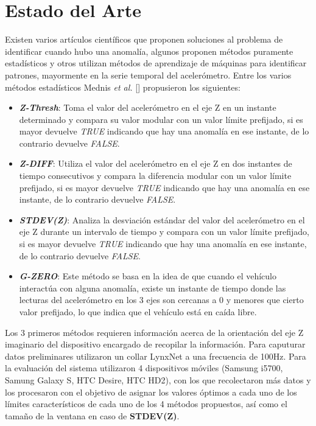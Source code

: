 \chapter{Estado del Arte}\label{chapter:state-of-the-art}

Existen varios artículos científicos que proponen soluciones al problema de identificar cuando hubo una anomalía, algunos proponen métodos
puramente estadísticos y otros utilizan métodos de aprendizaje de máquinas para identificar patrones, mayormente en la serie temporal del
acelerómetro. Entre los varios métodos estadísticos Mednis {\it et al.} [] propusieron los siguientes:\\

\begin{itemize}
	\item  \emph{\textbf {Z-Thresh}}: Toma el valor del acelerómetro en el eje Z en un instante determinado y compara su valor modular con 
	un valor límite prefijado, si es mayor devuelve {\it TRUE} indicando que hay una anomalía en ese instante, de lo contrario devuelve {\it FALSE}.\\
	\item \emph{\textbf {Z-DIFF}}: Utiliza el valor del acelerómetro en el eje Z en dos instantes de tiempo consecutivos y compara la
		diferencia modular con un valor límite prefijado, si es mayor devuelve {\it TRUE} indicando que hay una anomalía en ese instante, de lo contrario devuelve {\it FALSE}.\\
	\item \emph{\textbf {STDEV(Z)}}: Analiza la desviación estándar del valor del acelerómetro en el eje Z durante un intervalo de
		tiempo y compara con un valor límite prefijado, si es mayor devuelve {\it TRUE} indicando que hay una anomalía en ese instante, de lo contrario devuelve {\it FALSE}.\\ 
	\item \emph{\textbf {G-ZERO}}: Este método se basa en la idea de que cuando el vehículo interactúa con alguna anomalía, existe un
		instante de tiempo donde las lecturas del acelerómetro en los 3 ejes son cercanas a 0 y menores que cierto valor prefijado, lo que indica que el vehículo está en caída libre.\\
\end{itemize}

Los 3 primeros métodos requieren información acerca de la orientación del eje Z imaginario del dispositivo encargado de recopilar la información. 
Para caputurar datos preliminares utilizaron un collar LynxNet a una frecuencia de 100Hz. Para la evaluación del sistema utilizaron 4 dispositivos
móviles (Samsung i5700, Samung Galaxy S, HTC Desire, HTC HD2), con los que recolectaron más datos y los procesaron con el objetivo de asignar los 
valores óptimos a cada uno de los límites característicos de cada uno de los 4 métodos propuestos, así como el tamaño de la ventana en caso de 
\textbf {STDEV(Z)}.\\

